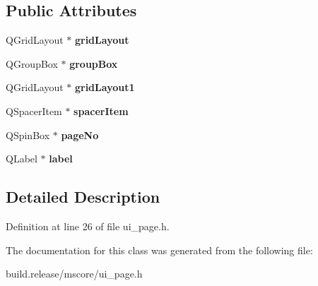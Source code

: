 \subsection*{Public Attributes}
\begin{DoxyCompactItemize}
\item 
\mbox{\label{class_ui___page_base_a7373e2d2af31365cb0f8e79aff08d3e3}} 
Q\+Grid\+Layout $\ast$ {\bfseries grid\+Layout}
\item 
\mbox{\label{class_ui___page_base_a646611bbac85e990fc10af42fb150baa}} 
Q\+Group\+Box $\ast$ {\bfseries group\+Box}
\item 
\mbox{\label{class_ui___page_base_ac8f92002cf183bb6f2c4e2c6153a2af3}} 
Q\+Grid\+Layout $\ast$ {\bfseries grid\+Layout1}
\item 
\mbox{\label{class_ui___page_base_af42d6431e53ecb000f416557d6479a3b}} 
Q\+Spacer\+Item $\ast$ {\bfseries spacer\+Item}
\item 
\mbox{\label{class_ui___page_base_a699cb673fa07d1c7a30bbd518b589ab5}} 
Q\+Spin\+Box $\ast$ {\bfseries page\+No}
\item 
\mbox{\label{class_ui___page_base_a7321e7e90a13ab6851e18bda4f8bb439}} 
Q\+Label $\ast$ {\bfseries label}
\end{DoxyCompactItemize}


\subsection{Detailed Description}


Definition at line 26 of file ui\+\_\+page.\+h.



The documentation for this class was generated from the following file\+:\begin{DoxyCompactItemize}
\item 
build.\+release/mscore/ui\+\_\+page.\+h\end{DoxyCompactItemize}
